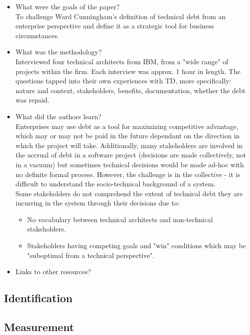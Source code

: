 \documentclass{mprop}
\begin{document}
\begin{itemize}
	\item What were the goals of the paper? \\
	To challenge Ward Cunningham's definition of technical debt from an enterprise perspective and define it as a strategic tool for business circumstances.
	\item What was the methodology? \\
	Interviewed four technical architects from IBM, from a "wide range" of projects within the firm. Each interview was approx. 1 hour in length. 
	The questions tapped into their own experiences with TD, more specifically: nature and context, stakeholders, benefits, documentation, whether the debt was repaid. 
	\item What did the authors learn? \\
	Enterprises may use debt as a tool for maximizing competitive advantage, which may or may not be paid in the future dependant on the direction in which the project will take.
	Additionally, many stakeholders are involved in the accrual of debt in a software project (decisions are made collectively, not in a vacuum) but sometimes technical decisions would be made ad-hoc with no definite formal process.
	However, the challenge is in the collective - it is difficult to understand the socio-technical background of a system. \\
	
	Some stakeholders do not comprehend the extent of technical debt they are incurring in the system through their decisions due to: 
	\begin{itemize}
		\item No vocabulary between technical architects and non-technical stakeholders.
		\item Stakeholders having competing goals and "win" conditions which may be "suboptimal from a technical perspective".
	\end{itemize} 
	\item Links to other resources?
\end{itemize}

\subsection{Identification}


\subsection{Measurement}
\end{document}
